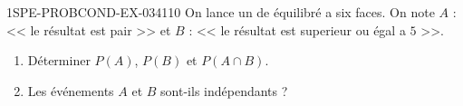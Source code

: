 \begin{exercice}{1SPE-PROBCOND-EX-034}{1}{10}
On lance un de équilibré a six faces. On note $A$ : << le résultat est pair >> et $B$ : << le résultat est superieur ou égal a $5$ >>.

\begin{enumerate}
  \item Déterminer $P(A)$, $P(B)$ et $P(A \cap B)$.
  \item Les événements $A$ et $B$ sont-ils indépendants ?
\end{enumerate}
\end{exercice}

